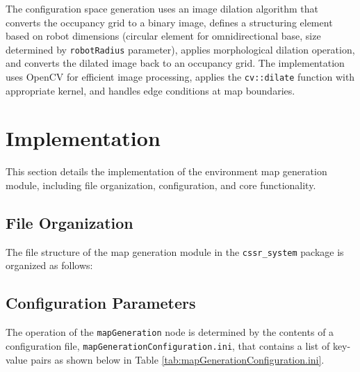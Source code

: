 \documentclass{CSSRforAfrica}
\renewcommand{\DTstyle}{\footnotesize\sffamily}
\begin{document}
\noindent The configuration space generation uses an image dilation algorithm that converts the occupancy grid to a binary image, defines a structuring element based on robot dimensions (circular element for omnidirectional base, size determined by \texttt{robotRadius} parameter), applies morphological dilation operation, and converts the dilated image back to an occupancy grid. The implementation uses OpenCV for efficient image processing, applies the \texttt{cv::dilate} function with appropriate kernel, and handles edge conditions at map boundaries.


\newpage
\section{Implementation}
This section details the implementation of the environment map generation module, including file organization, configuration, and core functionality.

\subsection*{File Organization}

The file structure of the map generation module in the \texttt{cssr\_system} package is organized as follows:

\vspace*{0.5em}

\renewcommand*\DTstyle{\ttfamily}

\subsection*{Configuration Parameters}

\begin{sloppypar}
The operation of the \texttt{mapGeneration} node is determined by the contents 
of a configuration file, \texttt{mapGenerationConfiguration.ini}, that contains 
a list of key-value pairs as shown below in Table \ref{tab:mapGenerationConfiguration.ini}.
\end{sloppypar}
\end{document}
